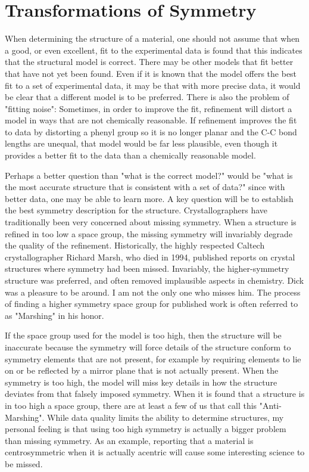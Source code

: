 \chapter{Transformations of Symmetry}\label{Chap:Subgroups}

When determining the structure of a material, one should not assume that when a good, or even excellent, fit to the experimental data is found that this indicates that the structural model is correct. 
There may be other models that fit better that have not yet been found. 
Even if it is known that the model offers the best fit to a set of experimental data, it may be that with more precise data, it would be clear that a different model is to be preferred. There is also the problem of "fitting noise": Sometimes, in order to improve the fit, refinement will distort a model in ways that are not chemically reasonable. If refinement improves the fit to data by distorting a phenyl group so it is no longer planar and the C-C bond lengths are unequal, that model would be far less plausible, even though it provides a better fit to the data than a chemically reasonable model. 

Perhaps a better question than "what is the correct model?" would be "what is the most accurate structure that is consistent with a set of data?" since with better data, one may be able to learn more. A key question will be to establish the best symmetry description for the structure. Crystallographers have traditionally been very concerned about missing symmetry. When a structure is refined in too low a space group, the missing symmetry will invariably degrade the quality of the refinement. Historically, the highly respected Caltech crystallographer Richard Marsh, who died in 1994, published reports on crystal structures where symmetry had been missed. Invariably, the higher-symmetry structure was preferred, and often removed implausible aspects in chemistry. Dick was a pleasure to be around. I am not the only one who misses him. The process of finding a higher symmetry space group for published work is often referred to as "Marshing" in his honor. 

If the space group used for the model is too high, then the structure will be inaccurate because the symmetry will force details of the structure conform to symmetry elements that are not present, for example by requiring elements to lie on or be reflected by a mirror plane that is not actually present. When the symmetry is too high, the model will miss key details in how the structure deviates from that falsely imposed symmetry. 
When it is found that a structure is in too high a space group, there are at least a few of us that call this "Anti-Marshing". While data quality limits the ability to determine structures, my personal feeling is that using too high symmetry is actually a bigger problem than missing symmetry. As an example, reporting that a material is centrosymmetric when it is actually acentric will cause some interesting science to be missed. 

